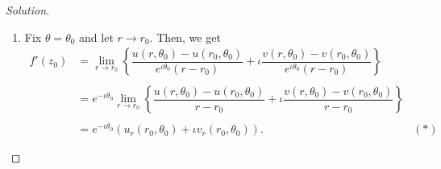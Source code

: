 \documentclass[12pt]{article}
\theoremstyle{definition}
\numberwithin{thm}{section}
\newenvironment{soln}{\begin{proof}[Solution]}{\end{proof}}
\begin{document}
\begin{enumerate}
\begin{soln}
		\begin{enumerate}
			\item Fix $\theta = \theta_0$ and let $r \to r_0.$ Then, we get
			\begin{align*} 
				f'(z_0) &= \lim_{r\to r_0}\left\{\dfrac{u(r, \theta_0) - u(r_0, \theta_0)}{e^{\iota\theta_0}(r - r_0)} + \iota\dfrac{v(r, \theta_0) - v(r_0, \theta_0)}{e^{\iota\theta_0}(r - r_0)}\right\}\\~\\
				&= e^{-\iota\theta_0}\lim_{r\to r_0}\left\{\dfrac{u(r, \theta_0) - u(r_0, \theta_0)}{r - r_0} + \iota\dfrac{v(r, \theta_0) - v(r_0, \theta_0)}{r - r_0}\right\}\\~\\
				&= e^{-\iota\theta_0}\left(u_r(r_0, \theta_0) + \iota v_r(r_0, \theta_0)\right). & (*)
			\end{align*}


\end{enumerate}
\end{soln}
\end{enumerate}
\end{document}
